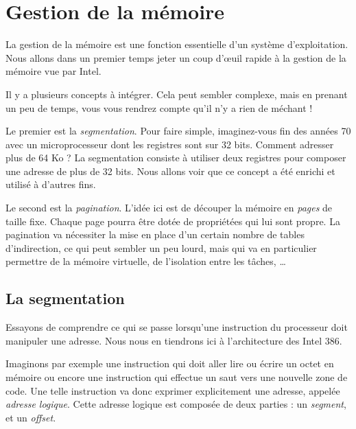 \section{Gestion de la mémoire}

   La gestion de la mémoire est une fonction essentielle d'un système
d'exploitation. Nous allons dans un premier temps jeter un coup
d'\oe{}uil rapide à la gestion de la mémoire vue par Intel.

   Il y a plusieurs concepts à intégrer. Cela peut sembler complexe,
mais en prenant un peu de temps, vous vous rendrez compte qu'il n'y a
rien de méchant !

   Le premier est la {\em segmentation}. Pour faire simple,
imaginez-vous fin des années 70 avec un microprocesseur dont les
registres sont sur 32 bits. Comment adresser plus de 64 Ko ? La
segmentation consiste à utiliser deux registres pour composer une
adresse de plus de 32 bits. Nous allons voir que ce concept a été
enrichi et utilisé à d'autres fins.

   Le second est la {\em pagination}. L'idée ici est de découper la
mémoire en {\em pages} de taille fixe. Chaque page pourra être dotée
de propriétées qui lui sont propre. La pagination va nécessiter la
mise en place d'un certain nombre de tables d'indirection, ce qui peut
sembler un peu lourd, mais qui va en particulier permettre de la
mémoire virtuelle, de l'isolation entre les tâches, \ldots

%
\subsection{La segmentation}

   Essayons de comprendre ce qui se passe lorsqu'une instruction du
processeur doit manipuler une adresse. Nous nous en tiendrons ici à
l'architecture des Intel 386.
   
   Imaginons par exemple une instruction qui doit aller lire ou écrire
un octet en mémoire ou encore une instruction qui effectue un saut
vers une nouvelle zone de code. Une telle instruction va donc exprimer
explicitement une adresse, appelée {\em adresse logique}. Cette
adresse logique est composée de deux parties : un {\em segment}, et un
{\em offset}.

